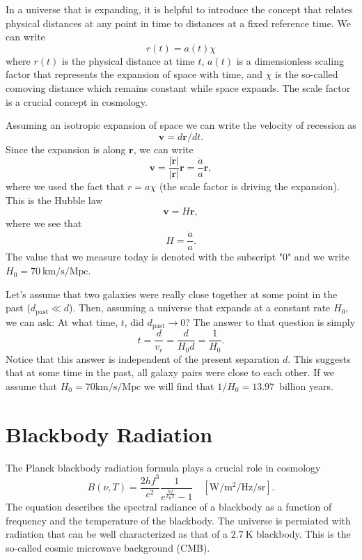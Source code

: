 \documentclass[a4paper,12pt]{article}
\theoremstyle{remark}
\newcommand{\mrm}[1]{\mathrm{#1}}
\renewcommand{\=}[1]{\stackrel{#1}{=}} %
\theoremstyle{plain}
\theoremstyle{definition}
\begin{document}
In a universe that is expanding, it is helpful to introduce the concept that relates physical distances at any point in time to distances at a fixed reference time. We can write
\begin{equation}
r(t) = a(t) \chi
\end{equation}
where $r(t)$ is the physical distance at time $t$, $a(t)$ is a dimensionless scaling factor that represents the expansion of space with time, and $\chi$ is the so-called comoving distance which remains constant while space expands. The scale factor is a crucial concept in cosmology. 

Assuming an isotropic expansion of space we can write the velocity of recession as 
\begin{equation}
\bm{v} = d\bm{r} / dt.
\end{equation}
Since the expansion is along $\bm{r}$, we can write 
\begin{equation}
\bm{v} = \frac{|\dot{\bm{r}}|}{|\bm{r}|} \bm{r} = \frac{\dot{a}}{a} \bm{r},
\end{equation}
where we used the fact that $r = a\chi$ (the scale factor is driving the expansion). This is the Hubble law
\begin{equation}
\bm{v} = H\bm{r},
\end{equation}
where we see that 
\begin{equation}
H = \frac{\dot{a}}{a}.
\end{equation}
The value that we measure today is denoted with the subscript "0" and we write $H_0 = 70 \:\mrm{km/s/Mpc}$.

Let's assume that two galaxies were really close together at some point in the past ($d_\mrm{past} \ll d$). Then, assuming a universe that expands at a constant rate $H_0$, we can ask: At what time, $t$, did $d_\mrm{past} \to 0$? The answer to that question is simply 
\begin{equation}
t = \frac{d}{v_r} = \frac{d}{H_0 d} = \frac{1}{H_0}.
\end{equation}
Notice that this answer is independent of the present separation $d$. This suggests that at some time in the past, all galaxy pairs were close to each other. If we assume that $H_0 = 70 \mrm{km/s/Mpc}$ we will find that $1/H_0 = 13.97$~billion years. 



\section{Blackbody Radiation}
The Planck blackbody radiation formula plays a crucial role in cosmology
\begin{equation}
B(\nu, T) = \frac{2hf^3}{c^2} \frac{1}{e^\frac{hf}{k_\mrm{B}T} - 1} \quad [\mrm{W/m^2/Hz/sr}].
\label{eq:bb}
\end{equation}
The equation describes the spectral radiance of a blackbody as a function of frequency and the temperature of the blackbody. The universe is permiated with radiation that can be well characterized as that of a $2.7\:\mrm{K}$ blackbody. This is the so-called cosmic microwave background (CMB).
\end{document}
